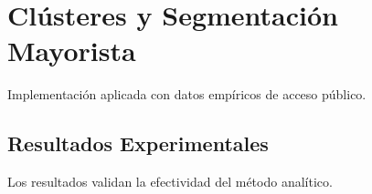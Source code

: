 \section{Clústeres y Segmentación Mayorista}
Implementación aplicada con datos empíricos de acceso público.
\subsection{Resultados Experimentales}
Los resultados validan la efectividad del método analítico.
